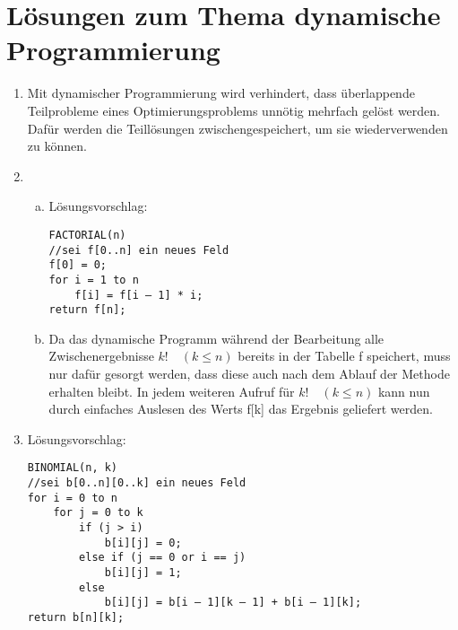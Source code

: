 \documentclass{scrartcl}
\begin{document}
\section*{Lösungen zum Thema dynamische Programmierung}
\begin{enumerate}[(1)]

\item Mit dynamischer Programmierung wird verhindert, dass überlappende Teilprobleme eines Optimierungsproblems unnötig mehrfach gelöst werden. Dafür werden die Teillösungen zwischengespeichert, um sie wiederverwenden zu können.

\item\begin{enumerate}[(a)]
\item Lösungsvorschlag:\begin{verbatim}FACTORIAL(n)
//sei f[0..n] ein neues Feld
f[0] = 0;
for i = 1 to n
    f[i] = f[i – 1] * i;
return f[n];
\end{verbatim}
\item Da das dynamische Programm während der Bearbeitung alle Zwischenergebnisse $k!\quad (k \leq n)$ bereits in der Tabelle f speichert, muss nur dafür gesorgt werden, dass diese auch nach dem Ablauf der Methode erhalten bleibt. In jedem weiteren Aufruf für $k!\quad (k \leq n)$ kann nun durch einfaches Auslesen des Werts f[k] das Ergebnis geliefert werden.
\end{enumerate}

\item Lösungsvorschlag:\begin{verbatim}BINOMIAL(n, k)
//sei b[0..n][0..k] ein neues Feld
for i = 0 to n
    for j = 0 to k
        if (j > i)
            b[i][j] = 0;
        else if (j == 0 or i == j)
            b[i][j] = 1;
        else
            b[i][j] = b[i – 1][k – 1] + b[i – 1][k];
return b[n][k];
\end{verbatim}

\end{enumerate}
\end{document}

